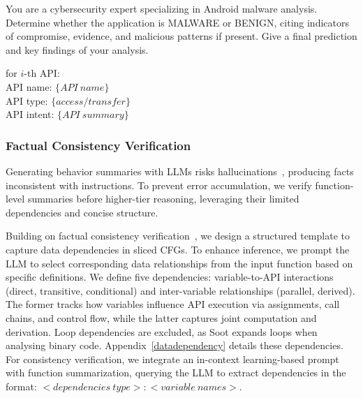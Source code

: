 \begin{tcolorbox}[title=Tier 3: APK Maliciousness Judgement Prompt, 
left=2pt, %
right=2pt, %
top=3pt, %
bottom=3pt, %
fonttitle=\small,colback=gray!20, colframe=black, colbacktitle=black, coltitle=white, sharp corners, fontupper=\small, fontlower=\small, before upper=\raggedright, before lower=\raggedright]
You are a cybersecurity expert specializing in Android malware analysis. Determine whether the application is MALWARE or BENIGN, citing indicators of compromise, evidence, and malicious patterns if present. Give a final prediction and key findings of your analysis.

for $i$-th API: \\
\makebox[2em]{}API name: $\{API\ name\}$ \\
\makebox[2em]{}API type: $\{access/transfer\}$\\
\makebox[2em]{}API intent: $\{API\ summary\}$
\end{tcolorbox}


\subsubsection{Factual Consistency Verification}
Generating behavior summaries with LLMs risks hallucinations~\cite{nature24hallucinations}, producing facts inconsistent with instructions. To prevent error accumulation, we verify function-level summaries before higher-tier reasoning, leveraging their limited dependencies and concise structure.

Building on factual consistency verification~\cite{cloze, factasking}, we design a structured template to capture data dependencies in sliced CFGs. To enhance inference, we prompt the LLM to select corresponding data relationships from the input function based on specific definitions. We define five dependencies: variable-to-API interactions (direct, transitive, conditional) and inter-variable relationships (parallel, derived). The former tracks how variables influence API execution via assignments, call chains, and control flow, while the latter captures joint computation and derivation. Loop dependencies are excluded, as Soot expands loops when analysing binary code. Appendix~\ref{datadependency} details these dependencies. For consistency verification, we integrate an in-context learning-based prompt with function summarization, querying the LLM to extract dependencies in the format: $<dependencies\ type>:<variable\ names>$.


